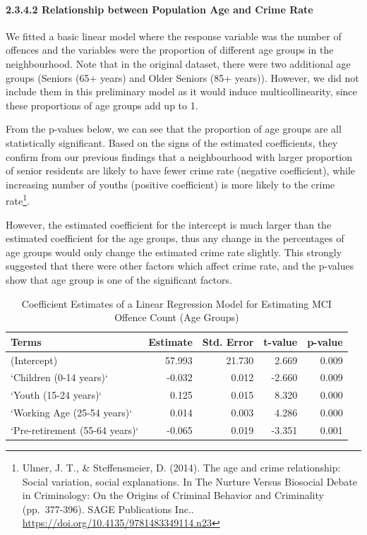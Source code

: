 \documentclass[
]{article}
\begin{document}
\hypertarget{relationship-between-population-age-and-crime-rate}{%
\paragraph{2.3.4.2 Relationship between Population Age and Crime
Rate}\label{relationship-between-population-age-and-crime-rate}}

We fitted a basic linear model where the response variable was the
number of offences and the variables were the proportion of different
age groups in the neighbourhood. Note that in the original dataset,
there were two additional age groups (Seniors (65+ years) and Older
Seniors (85+ years)). However, we did not include them in this
preliminary model as it would induce multicollinearity, since these
proportions of age groups add up to 1.

From the p-values below, we can see that the proportion of age groups
are all statistically significant. Based on the signs of the estimated
coefficients, they confirm from our previous findings that a
neighbourhood with larger proportion of senior residents are likely to
have fewer crime rate (negative coefficient), while increasing number of
youths (positive coefficient) is more likely to the crime
rate\footnote{Ulmer, J. T., \& Steffensmeier, D. (2014). The age and
  crime relationship: Social variation, social explanations. In The
  Nurture Versus Biosocial Debate in Criminology: On the Origins of
  Criminal Behavior and Criminality (pp.~377-396). SAGE Publications
  Inc.. \url{https://doi.org/10.4135/9781483349114.n23}}.

However, the estimated coefficient for the intercept is much larger than
the estimated coefficient for the age groups, thus any change in the
percentages of age groups would only change the estimated crime rate
slightly. This strongly suggested that there were other factors which
affect crime rate, and the p-values show that age group is one of the
significant factors.

\begin{table}

\caption{\label{tab:crime-vs-age-lm}Coefficient Estimates of a Linear Regression Model for Estimating MCI Offence Count (Age Groups)}
\centering
\begin{tabular}[t]{l|r|r|r|r}
\hline
Terms & Estimate & Std. Error & t-value & p-value\\
\hline
(Intercept) & 57.993 & 21.730 & 2.669 & 0.009\\
\hline
`Children (0-14 years)` & -0.032 & 0.012 & -2.660 & 0.009\\
\hline
`Youth (15-24 years)` & 0.125 & 0.015 & 8.320 & 0.000\\
\hline
`Working Age (25-54 years)` & 0.014 & 0.003 & 4.286 & 0.000\\
\hline
`Pre-retirement (55-64 years)` & -0.065 & 0.019 & -3.351 & 0.001\\
\hline
\end{tabular}
\end{table}
\end{document}
